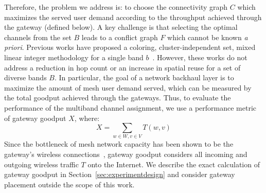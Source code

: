 


Therefore, the problem we address is: to choose the connectivity graph $C$ which maximizes
the served user demand according to the throughput achieved through the gateway (defined below).
A key challenge is that selecting the optimal channels from
the set $B$ leads to a conflict graph $F$ which cannot be known {\it a priori}. Previous
works have proposed a coloring, cluster-independent set, mixed linear integer methodology
for a single band $b$~\cite{mishra2005weighted,peng2012efficient,tang2005interference}. However,
these works do not address a reduction in hop count or an increase in spatial reuse for a set of 
diverse bands $B$.  In particular, the goal of a network backhaul layer is to maximize 
the amount of mesh user demand served, which can be measured by the total goodput 
achieved through the gateways. Thus, to evaluate the 
performance of the multiband channel assignment, we use a performance metric of gateway goodput $X$, where:
\begin{equation}
\label{eq:goodput}
X=\sum_{w \in W, v \in V}T(w,v)
\end{equation}
Since the bottleneck of mesh network capacity has been shown to be the gateway's wireless 
connections~\cite{robinson2008adding}, gateway goodput considers all incoming and outgoing
wireless traffic $T$ onto the Internet. We describe the exact calculation of gateway goodput in 
Section~\ref{sec:experimentdesign} and consider gateway placement outside the scope of this work.

